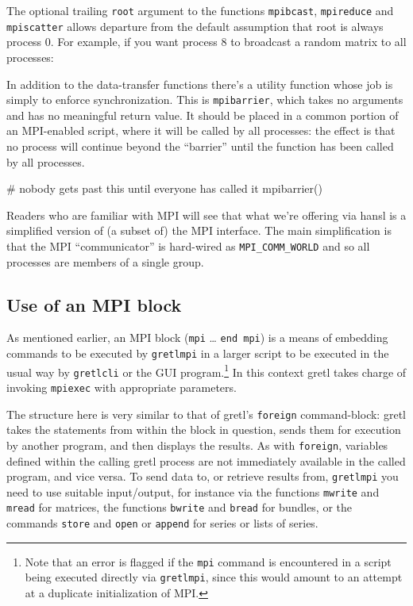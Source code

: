 \documentclass{article}
\begin{document}
The optional trailing \texttt{root} argument to the functions
\texttt{mpibcast}, \texttt{mpireduce} and \texttt{mpiscatter} allows
departure from the default assumption that root is always process
0. For example, if you want process 8 to broadcast a random matrix to
all processes:

In addition to the data-transfer functions there's a utility function
whose job is simply to enforce synchronization.  This is
\texttt{mpibarrier}, which takes no arguments and has no meaningful
return value. It should be placed in a common portion of an
MPI-enabled script, where it will be called by all processes: the
effect is that no process will continue beyond the ``barrier'' until
the function has been called by all processes.
\begin{code}
# nobody gets past this until everyone has called it
mpibarrier()
\end{code}

\vspace{1ex}

Readers who are familiar with MPI will see that what we're offering
via hansl is a simplified version of (a subset of) the MPI
interface. The main simplification is that the MPI ``communicator'' is
hard-wired as \verb|MPI_COMM_WORLD| and so all processes are members
of a single group.

\subsection{Use of an MPI block}
\label{subsec:mpi-block}

As mentioned earlier, an MPI block (\texttt{mpi} \dots{} \texttt{end
  mpi}) is a means of embedding commands to be executed by
\texttt{gretlmpi} in a larger script to be executed in the usual
way by \texttt{gretlcli} or the GUI program.\footnote{Note that an
  error is flagged if the \texttt{mpi} command is encountered in a
  script being executed directly via \texttt{gretlmpi}, since this
  would amount to an attempt at a duplicate initialization of MPI.}
In this context gretl takes charge of invoking \texttt{mpiexec} with
appropriate parameters.

The structure here is very similar to that of gretl's \texttt{foreign}
command-block: gretl takes the statements from within the block in
question, sends them for execution by another program, and then
displays the results. As with \texttt{foreign}, variables defined
within the calling gretl process are not immediately available in the
called program, and vice versa. To send data to, or retrieve results
from, \texttt{gretlmpi} you need to use suitable input/output, for
instance via the functions \texttt{mwrite} and \texttt{mread} for
matrices, the functions \texttt{bwrite} and \texttt{bread} for
bundles, or the commands \texttt{store} and \texttt{open} or
\texttt{append} for series or lists of series.
\end{document}
